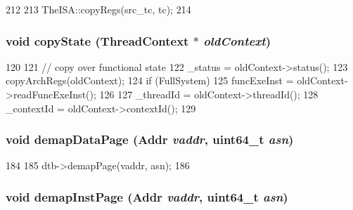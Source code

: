 \begin{DoxyCode}
212 {
213     TheISA::copyRegs(src_tc, tc);
214 }
\end{DoxyCode}
\hypertarget{classSimpleThread_a51d24d05286ee0c24574372ca4c517b6}{
\subsubsection[{copyState}]{\setlength{\rightskip}{0pt plus 5cm}void copyState ({\bf ThreadContext} $\ast$ {\em oldContext})}}
\label{classSimpleThread_a51d24d05286ee0c24574372ca4c517b6}



\begin{DoxyCode}
120 {
121     // copy over functional state
122     _status = oldContext->status();
123     copyArchRegs(oldContext);
124     if (FullSystem)
125         funcExeInst = oldContext->readFuncExeInst();
126 
127     _threadId = oldContext->threadId();
128     _contextId = oldContext->contextId();
129 }
\end{DoxyCode}
\hypertarget{classSimpleThread_a26789603cc94992d18f8ddedfff96acf}{
\subsubsection[{demapDataPage}]{\setlength{\rightskip}{0pt plus 5cm}void demapDataPage ({\bf Addr} {\em vaddr}, \/  uint64\_\-t {\em asn})}}
\label{classSimpleThread_a26789603cc94992d18f8ddedfff96acf}



\begin{DoxyCode}
184     {
185         dtb->demapPage(vaddr, asn);
186     }
\end{DoxyCode}
\hypertarget{classSimpleThread_ac8a36d45a839b07f50b73f1eee119615}{
\subsubsection[{demapInstPage}]{\setlength{\rightskip}{0pt plus 5cm}void demapInstPage ({\bf Addr} {\em vaddr}, \/  uint64\_\-t {\em asn})}}
\label{classSimpleThread_ac8a36d45a839b07f50b73f1eee119615}



